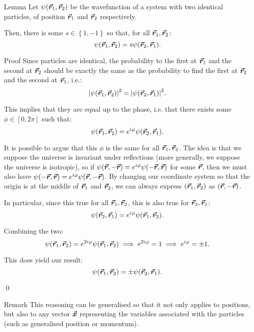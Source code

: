 \documentclass[a4paper]{article}
\begin{document}
\begin{parag}{Lemma}
    Let $\psi\left(\bvec{r}_1, \bvec{r}_2\right)$ be the wavefunction of a system with two identical particles, of position $\bm{\protect\vec{r}}_1$ and $\bm{\protect\vec{r}}_2$ respectively. 

    Then, there is some $s \in \left\{1, -1\right\}$ so that, for all $\bm{\protect\vec{r}}_1, \bm{\protect\vec{r}}_2$:
    \[\psi\left(\bvec{r}_1, \bvec{r}_2\right) = s \psi\left(\bvec{r}_2, \bvec{r}_1\right).\]

    \begin{subparag}{Proof}
        Since particles are identical, the probability to the first at $\bm{\protect\vec{r}}_1$ and the second at $\bm{\protect\vec{r}}_2$ should be exactly the same as the probability to find the first at $\bm{\protect\vec{r}}_2$ and the second at $\bm{\protect\vec{r}}_1$, i.e.:
        \[\left|\psi\left(\bvec{r}_1, \bvec{r}_2\right)\right|^2 = \left|\psi\left(\bvec{r}_2, \bvec{r}_1\right)\right|^2.\]

        This implies that they are equal up to the phase, i.e. that there exists some $\phi \in \left[0, 2\pi\right]$ such that: 
        \[\psi\left(\bvec{r}_1, \bvec{r}_2\right) = e^{i \phi} \psi\left(\bvec{r}_2, \bvec{r}_1\right).\]

        It is possible to argue that this $\phi$ is the same for all $\bm{\protect\vec{r}}_1, \bm{\protect\vec{r}}_2$. The idea is that we suppose the universe is invariant under reflections (more generally, we suppose the universe is isotropic), so if $\psi\left(\bvec{r}, -\bvec{r}\right) = e^{i\phi}\psi\left(-\bvec{r}, \bvec{r}\right)$ for some $\bm{\protect\vec{r}}$, then we must also have $\psi\left(-\bvec{r}, \bvec{r}\right) = e^{i\phi} \psi\left(\bvec{r}, -\bvec{r}\right)$. By changing our coordinate system so that the origin is at the middle of $\bm{\protect\vec{r}}_1$ and $\bm{\protect\vec{r}}_2$, we can always express $\left(\bvec{r}_1, \bvec{r}_2\right)$ as $\left(\bvec{r}, -\bvec{r}\right)$.

        In particular, since this true for all $\bm{\protect\vec{r}}_1, \bm{\protect\vec{r}}_2$, this is also true for $\bm{\protect\vec{r}}_2, \bm{\protect\vec{r}}_1$: 
        \[\psi\left(\bvec{r}_2, \bvec{r}_1\right) = e^{i \phi} \psi\left(\bvec{r}_1, \bvec{r}_2\right).\]

        Combining the two:
        \[\psi\left(\bvec{r}_1, \bvec{r}_2\right) = e^{2 i \phi} \psi\left(\bvec{r}_1, \bvec{r}_2\right) \implies e^{2 i \phi} = 1 \implies e^{i \phi} = \pm 1.\]
        
        This does yield our result:
        \[\psi\left(\bvec{r}_1, \bvec{r}_2\right) = \pm \psi\left(\bvec{r}_2, \bvec{r}_1\right).\]

        \qed
    \end{subparag}

    \begin{subparag}{Remark}
        This reasoning can be generalised so that it not only applies to positions, but also to any vector $\bm{\protect\vec{x}}$ representing the variables associated with the particles (such as generalised position or momentum).
    \end{subparag}
\end{parag}
\end{document}
